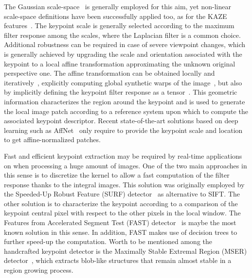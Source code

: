 \documentclass[times,twocolumn,final,authoryear]{elsarticle}
\begin{document}
The Gaussian scale-space~\citep{linbook} is generally employed for this aim, yet non-linear scale-space definitions have been successfully applied too, as for the KAZE features~\citep{kaze}. The keypoint scale is generally selected according to the maximum filter response among the scales, where the Laplacian filter is a common choice. Additional robustness can be required in case of severe viewpoint changes, which is generally achieved by upgrading the scale and orientation associated with the keypoint to a local affine transformation approximating the unknown original perspective one. The affine transformation can be obtained locally and iteratively~\citep{hess_lapl_affine}, explicitly computing global synthetic warps of the image~\citep{asift}, but also by implicitly defining the keypoint filter response as a tensor~\citep{harris_tensor}. This geometric information characterizes the region around the keypoint and is used to generate the local image patch according to a reference system upon which to compute the associated keypoint descriptor. Recent state-of-the-art solutions based on deep learning such as AffNet~\citep{affnet} only require to provide the keypoint scale and location to get affine-normalized patches.

\vspace{-0.25em}
Fast and efficient keypoint extraction may be required by real-time applications on when processing a huge amount of images. One of the two main approaches in this sense is to discretize the kernel to allow a fast computation of the filter response thanks to the integral images. This solution was originally employed by the Speeded-Up Robust Feature (SURF) detector~\citep{surf} as alternative to SIFT. The other solution is to characterize the keypoint according to a comparison of the keypoint central pixel with respect to the other pixels in the local window. The Features from Accelerated Segment Test (FAST) detector~\citep{fast} is maybe the most known solution in this sense. In addition, FAST makes use of decision trees to further speed-up the computation. Worth to be mentioned among the handcrafted keypoint detector is the Maximally Stable Extremal Region (MSER) detector~\citep{mser}, which extracts blob-like structures that remain almost stable in a region growing process.
\end{document}
